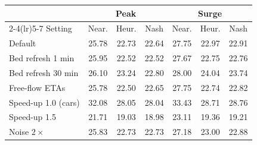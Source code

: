 \begin{tabular}{lcccccc}
\toprule
 & \multicolumn{3}{c}{Peak} & \multicolumn{3}{c}{Surge} \\
\cmidrule(lr){2-4}\cmidrule(lr){5-7}
Setting & Near. & Heur. & Nash & Near. & Heur. & Nash \\
\midrule
Default & 25.78 & 22.73 & 22.64 & 27.75 & 22.97 & 22.91 \\
Bed refresh 1 min & 25.95 & 22.52 & 22.52 & 27.67 & 22.75 & 22.76 \\
Bed refresh 30 min & 26.10 & 23.24 & 22.80 & 28.00 & 24.04 & 23.74 \\
Free-flow ETAs & 25.78 & 22.50 & 22.65 & 27.75 & 22.74 & 22.82 \\
Speed-up 1.0 (cars) & 32.08 & 28.05 & 28.04 & 33.43 & 28.71 & 28.76 \\
Speed-up 1.5 & 21.71 & 19.03 & 18.98 & 23.11 & 19.36 & 19.21 \\
Noise $2\times$ & 25.83 & 22.73 & 22.73 & 27.18 & 23.00 & 22.88 \\
\bottomrule
\end{tabular}
